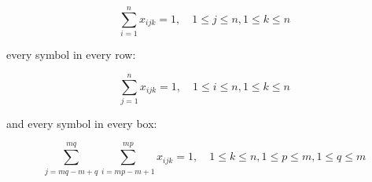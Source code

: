 \begin{equation}
 \sum_{i = 1}^{n} x_{ijk} = 1, \quad 1 \leq j \leq n, 1 \leq k \leq n
\end{equation}

every symbol in every row:

\begin{equation}
 \sum_{j = 1}^{n} x_{ijk} = 1, \quad 1 \leq i \leq n, 1 \leq k \leq n
\end{equation}

and every symbol in every box:

\begin{equation}
 \sum_{j = mq - m + q}^{mq} \sum_{i = mp - m + 1}^{mp} x_{ijk} = 1, \quad 1 \leq k \leq n, 1 \leq p \leq m, 1 \leq q \leq m
\end{equation}




